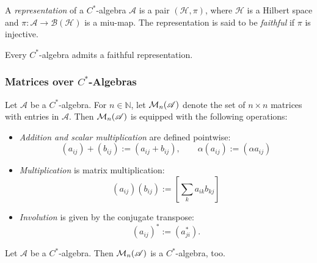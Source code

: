\begin{definition}
  A \emph{representation} of a \( C^* \)-algebra \(  \mathscr{A} \) is a pair \( (\mathcal{H}, \pi) \), where \( \mathcal{H} \) is a Hilbert space and \( \pi:  \mathscr{A} \to \mathcal{B}(\mathcal{H}) \) is a miu-map. The representation is said to be \emph{faithful} if \( \pi \) is injective. 
\end{definition}

\begin{theorem} \cite[Theorem 9.18.]{takesakiTheoryOperatorAlgebras1979}
  Every $C^*$-algebra admits a faithful representation.
\end{theorem}

\subsubsection{Matrices over $C^*$-Algebras}

\begin{definition}
  Let \( \mathscr{A} \) be a \(C^*\)-algebra. For \( n \in \mathbb{N} \), let \( \mathcal{M}_{n}(\mathscr{A} )\) denote the set of \( n \times n \) matrices with entries in \( \mathscr{A} \). Then \( \mathcal{M}_{n}(\mathscr{A} )\) is equipped with the following operations:

\begin{itemize}
    \item \emph{Addition and scalar multiplication} are defined pointwise:
    \[
    (a_{ij}) + (b_{ij}) := (a_{ij} + b_{ij}), \qquad
    \alpha (a_{ij}) := (\alpha a_{ij})
    \]
    
    \item \emph{Multiplication} is matrix multiplication:
    \[
    (a_{ij}) (b_{ij}) := \left[ \sum_k a_{ik} b_{kj} \right]
    \]
    
    \item \emph{Involution} is given by the conjugate transpose:
    \[
    (a_{ij})^* := (a_{ji}^*).
    \]
\end{itemize}
\end{definition}

\begin{proposition} \cite[p.16-17]{paulsenCompletelyBoundedMaps2003}
  Let $ \mathscr{A}$ be a $C^*$-algebra. Then $\mathcal{M}_{n}(\mathscr{A})$ is a $C^*$-algebra, too.
\end{proposition}

